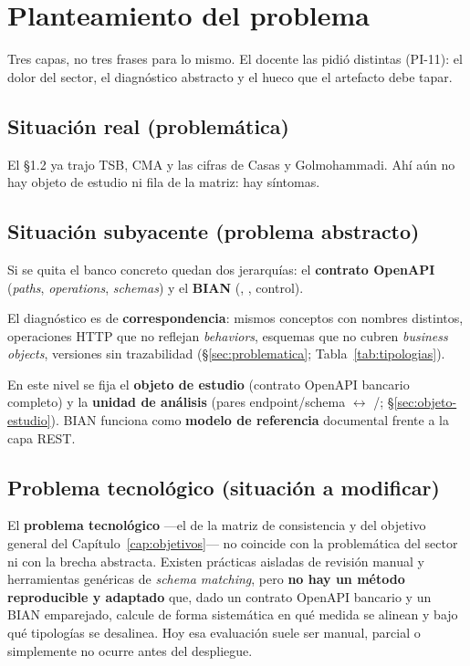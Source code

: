 \section{Planteamiento del problema}
\label{sec:planteamiento}

Tres capas, no tres frases para lo mismo. El docente las pidió distintas (PI-11): el dolor del
sector, el diagnóstico abstracto y el hueco que el artefacto debe tapar.

\subsection{Situación real (problemática)}

El §1.2 ya trajo TSB, CMA y las cifras de Casas y Golmohammadi. Ahí aún no hay objeto de estudio
ni fila de la matriz: hay síntomas.

\subsection{Situación subyacente (problema abstracto)}

Si se quita el banco concreto quedan dos jerarquías: el \textbf{contrato OpenAPI}
(\textit{paths}, \textit{operations}, \textit{schemas}) y el \textbf{\ServiceDomain{} BIAN}
(\Behavior{}, \BusinessObject{}, control).

El diagnóstico es de \textbf{correspondencia}: mismos conceptos con nombres distintos, operaciones
HTTP que no reflejan \textit{behaviors}, esquemas que no cubren \textit{business objects},
versiones sin trazabilidad (§\ref{sec:problematica}; Tabla~\ref{tab:tipologias}).

En este nivel se fija el \textbf{objeto de estudio} (contrato OpenAPI bancario completo) y la
\textbf{unidad de análisis} (pares endpoint/schema $\leftrightarrow$ \Behavior{}/\BusinessObject{};
§\ref{sec:objeto-estudio}). BIAN funciona como \textbf{modelo de referencia} documental frente a la
capa REST.

\subsection{Problema tecnológico (situación a modificar)}

El \textbf{problema tecnológico} ---el de la matriz de consistencia y del objetivo general del
Capítulo~\ref{cap:objetivos}--- no coincide con la problemática del sector ni con la brecha
abstracta. Existen prácticas aisladas de revisión manual y herramientas genéricas de
\textit{schema matching}, pero \textbf{no hay un método reproducible y adaptado} que, dado un
contrato OpenAPI bancario y un \ServiceDomain{} BIAN emparejado, calcule de forma sistemática en
qué medida se alinean y bajo qué tipologías se desalinea. Hoy esa evaluación suele ser manual,
parcial o simplemente no ocurre antes del despliegue.

